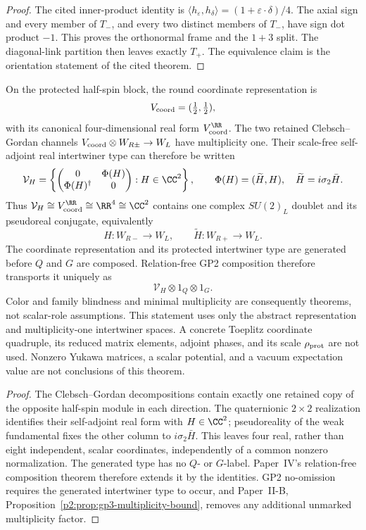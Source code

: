 \documentclass[12pt,a4paper]{article}
\begin{document}
\begin{proof}
The cited inner-product identity is
\(\langle h_\varepsilon,h_\delta\rangle
=(1+\varepsilon\cdot\delta)/4\).  The axial sign and every member of \(T_-\),
and every two distinct members of \(T_-\), have sign dot product \(-1\).
This proves the orthonormal frame and the \(1+3\) split.  The diagonal-link
partition then leaves exactly \(T_+\).  The equivalence claim is the
orientation statement of the cited theorem.
\end{proof}

\begin{theorem}
\label{p5:thm:generated-coordinate-higgs}
On the protected half-spin block, the round coordinate representation is
\[
V_{\rm coord}=(\tfrac12,\tfrac12),
\]
with its canonical four-dimensional real form \(V_{\rm coord}^{\RR}\).
The two retained Clebsch--Gordan channels
\(V_{\rm coord}\otimes W_{R\pm}\to W_L\) have multiplicity one.  Their
scale-free self-adjoint real intertwiner type can therefore be written
\[
 \mathcal V_H
 =
 \left\{
 \begin{pmatrix}0&\Phi(H)\\ \Phi(H)^\dagger&0\end{pmatrix}
 :H\in\CC^2
 \right\},
 \qquad
 \Phi(H)=(\widetilde H,H),\quad
 \widetilde H=i\sigma_2\bar H .
\]
Thus \(\mathcal V_H\cong V_{\rm coord}^{\RR}\cong\RR^4\cong\CC^2\) contains one complex
\(SU(2)_L\) doublet and its pseudoreal conjugate, equivalently
\[
 H:W_{R-}\longrightarrow W_L,\qquad
 \widetilde H:W_{R+}\longrightarrow W_L .
\]
The coordinate representation and its protected intertwiner type are
generated before \(Q\) and \(G\) are composed.
Relation-free GP2 composition therefore transports it uniquely as
\[
 \mathcal V_H\otimes1_Q\otimes1_G .
\]
Color and family blindness and minimal multiplicity are consequently
theorems, not scalar-role assumptions.  This statement uses only the abstract
representation and multiplicity-one intertwiner spaces.  A concrete Toeplitz
coordinate quadruple, its reduced matrix elements, adjoint phases, and its
scale \(\rho_{\rm prot}\) are not used.  Nonzero Yukawa matrices, a scalar
potential, and a vacuum expectation value are not conclusions of this theorem.
\end{theorem}

\begin{proof}
The Clebsch--Gordan decompositions contain exactly one retained copy of the
opposite half-spin module in each direction.  The quaternionic \(2\times2\)
realization identifies their self-adjoint real form with \(H\in\CC^2\);
pseudoreality of the weak fundamental fixes the other column to
\(i\sigma_2\bar H\).  This leaves four real, rather than eight independent,
scalar coordinates, independently of a common nonzero normalization.  The
generated type has no \(Q\)- or \(G\)-label.  Paper~IV's relation-free
composition theorem therefore extends it by the identities.  GP2 no-omission
requires the generated intertwiner type to occur, and Paper~II-B,
Proposition~\ref{p2:prop:gp3-multiplicity-bound}, removes any additional
unmarked multiplicity factor.
\end{proof}
\end{document}
